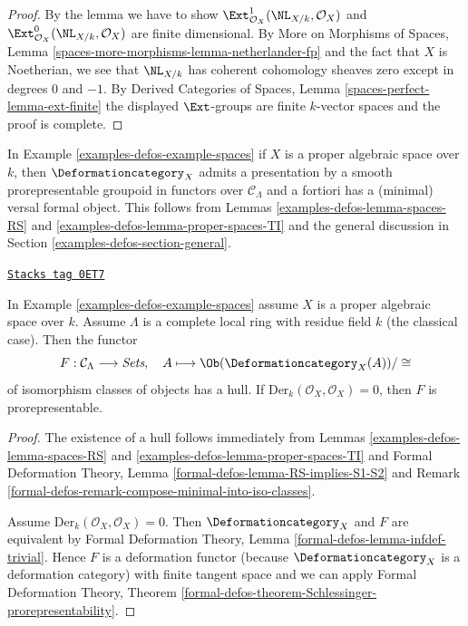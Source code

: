 \begin{proof}
By the lemma we have to show
$\Ext^1_{\mathcal{O}_X}(\NL_{X/k}, \mathcal{O}_X)$ and
$\Ext^0_{\mathcal{O}_X}(\NL_{X/k}, \mathcal{O}_X)$ are finite
dimensional. By More on Morphisms of Spaces, Lemma
\ref{spaces-more-morphisms-lemma-netherlander-fp}
and the fact that $X$ is Noetherian, we see that
$\NL_{X/k}$ has coherent cohomology sheaves zero except
in degrees $0$ and $-1$.
By Derived Categories of Spaces, Lemma \ref{spaces-perfect-lemma-ext-finite}
the displayed $\Ext$-groups are finite $k$-vector spaces
and the proof is complete.
\end{proof}

In Example \ref{examples-defos-example-spaces} if $X$ is a proper algebraic space over $k$,
then $\Deformationcategory_X$
admits a presentation by a smooth prorepresentable groupoid in functors
over $\mathcal{C}_\Lambda$
and a fortiori has a (minimal) versal formal object. This follows
from Lemmas \ref{examples-defos-lemma-spaces-RS} and
\ref{examples-defos-lemma-proper-spaces-TI}
and the general discussion in Section \ref{examples-defos-section-general}.

\begin{lemma}
\label{examples-defos-lemma-spaces-hull}
\href{https://stacks.math.columbia.edu/tag/0ET7}{\texttt{Stacks tag 0ET7}}

In Example \ref{examples-defos-example-spaces} assume $X$ is a proper algebraic space over $k$.
Assume $\Lambda$ is a complete local ring with residue field $k$
(the classical case). Then the functor
$$
F : \mathcal{C}_\Lambda \longrightarrow \textit{Sets},\quad
A \longmapsto \Ob(\Deformationcategory_X(A))/\cong
$$
of isomorphism classes of objects has a hull. If
$\text{Der}_k(\mathcal{O}_X, \mathcal{O}_X) = 0$, then
$F$ is prorepresentable.
\end{lemma}

\begin{proof}
The existence of a hull follows immediately from
Lemmas \ref{examples-defos-lemma-spaces-RS} and \ref{examples-defos-lemma-proper-spaces-TI} and
Formal Deformation Theory, Lemma \ref{formal-defos-lemma-RS-implies-S1-S2}
and Remark \ref{formal-defos-remark-compose-minimal-into-iso-classes}.

\medskip\noindent
Assume $\text{Der}_k(\mathcal{O}_X, \mathcal{O}_X) = 0$. Then
$\Deformationcategory_X$ and $F$ are equivalent by
Formal Deformation Theory, Lemma \ref{formal-defos-lemma-infdef-trivial}.
Hence $F$ is a deformation functor (because $\Deformationcategory_X$ is a
deformation category) with finite tangent space and we can apply
Formal Deformation Theory, Theorem
\ref{formal-defos-theorem-Schlessinger-prorepresentability}.
\end{proof}

